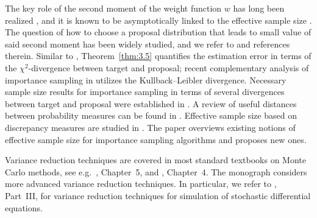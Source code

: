 The key role of the second moment of the weight function $w$ has long been realized
\cite{144, 186}, and it is known to be asymptotically linked to the effective sample size
\cite{128, 129, 144}. The question of how to choose a proposal distribution that leads to
small value of said second moment has been widely studied, and we refer to \cite{142} and
references therein. Similar to \cite{46}, Theorem~\ref{thm:3.5} quantifies the estimation
error in terms of the $\chi^2$-divergence between target and proposal; recent complementary
analysis of importance sampling in \cite{45} utilizes the Kullback--Leibler divergence.
Necessary sample size results for importance sampling in terms of several divergences between
target and proposal were established in \cite{207, 209}. A review of useful distances
between probability measures can be found in \cite{86}. Effective sample size based on
discrepancy measures are studied in \cite{156}. The paper \cite{71} overviews existing
notions of effective sample size for importance sampling algorithms and proposes new ones.

Variance reduction techniques are covered in most standard textbooks on Monte Carlo methods,
see e.g.\ \cite{14}, Chapter~5, and \cite{193}, Chapter~4. The monograph \cite{95} considers
more advanced variance reduction techniques. In particular, we refer to \cite{95}, Part~III,
for variance reduction techniques for simulation of stochastic differential equations.
